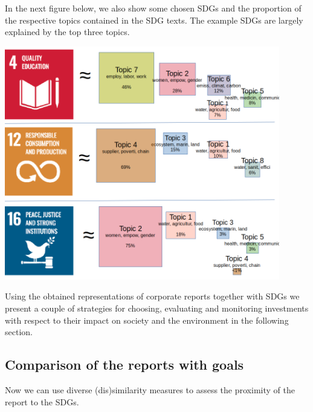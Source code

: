 \documentclass[
]{article}
\begin{document}
In the next figure below, we also show some chosen SDGs and the proportion of the respective topics contained in the SDG texts. The example SDGs are largely explained by the top three topics.

\includegraphics[width=0.9\textwidth,height=\textheight]{./images/goals_approx3.png}

Using the obtained representations of corporate reports together with SDGs we present a couple of strategies for choosing, evaluating and monitoring investments with respect to their impact on society and the environment in the following section.

\hypertarget{comparison-of-the-reports-with-goals}{%
\subsection{Comparison of the reports with goals}\label{comparison-of-the-reports-with-goals}}

Now we can use diverse (dis)similarity measures to assess the proximity of the report to the SDGs.
\end{document}
